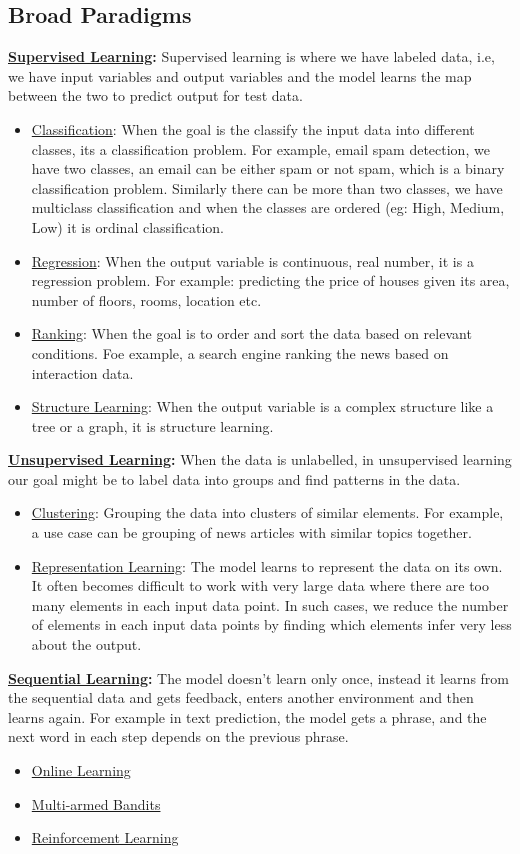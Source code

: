 \documentclass[12pt,a4paper]{article}
\begin{document}
\subsection{Broad Paradigms}
\textbf{\underline{Supervised Learning}:} Supervised learning is where we have labeled data, i.e, we have input variables and output variables and the model learns the map between the two to predict output for test data.
\begin{itemize}
    \item \underline{Classification}: When the goal is the classify the input data into different classes, its a classification problem. For example, email spam detection, we have two classes, an email can be either spam or not spam, which is a binary classification problem. Similarly there can be more than two classes, we have multiclass classification and when the classes are ordered (eg: High, Medium, Low) it is ordinal classification.
    \item \underline{Regression}: When the output variable is continuous, real number, it is a regression problem. For example: predicting the price of houses given its area, number of floors, rooms, location etc.
    \item \underline{Ranking}: When the goal is to order and sort the data based on relevant conditions. Foe example, a search engine ranking the news based on interaction data.
    \item \underline{Structure Learning}: When the output variable is a complex structure like a tree or a graph, it is structure learning. 
\end{itemize}
\textbf{\underline{Unsupervised Learning}:} When the data is unlabelled, in unsupervised learning our goal might be to label data into groups and find patterns in the data.
\begin{itemize}
    \item \underline{Clustering}: Grouping the data into clusters of similar elements. For example, a use case can be grouping of news articles with similar topics together.
    \item \underline{Representation Learning}: The model learns to represent the data on its own. It often becomes difficult to work with very large data where there are too many elements in each input data point. In such cases, we reduce the number of elements in each input data points by finding which elements infer very less about the output.
\end{itemize}
\textbf{\underline{Sequential Learning}:} The model doesn't learn only once, instead it learns from the sequential data and gets feedback, enters another environment and then learns again. For example in text prediction, the model gets a phrase, and the next word in each step depends on the previous phrase.
\begin{itemize}
    \item \underline{Online Learning}
    \item \underline{Multi-armed Bandits}
    \item \underline{Reinforcement Learning}
\end{itemize}
\end{document}
